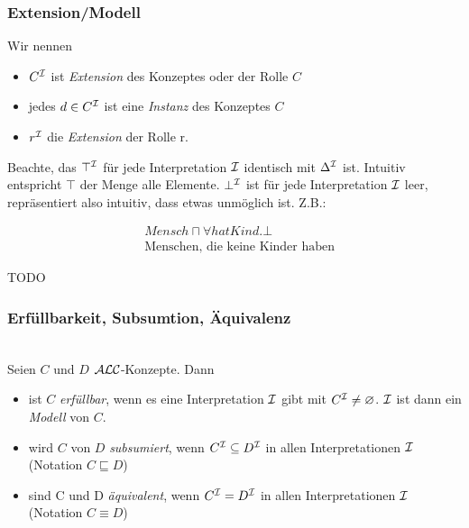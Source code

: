 \subsubsection{Extension/Modell}
\label{sec:exetension}

Wir nennen
\begin{itemize}
\item
  $C^{\mathcal{I}}$ ist \emph{Extension} des Konzeptes oder der Rolle $C$
\item
    jedes $d \in C^{\mathcal{I}}$ ist eine \emph{Instanz} des Konzeptes $C$
\item $r^{\mathcal{I}}$ die \emph{Extension} der Rolle r.
\end{itemize}

Beachte, das $\top^{\mathcal{I}}$ für jede Interpretation $\mathcal{I}$ identisch mit
$\Delta^{\mathcal{I}}$ ist. Intuitiv entspricht $\top$ der Menge alle Elemente.
$\bot^{\mathcal{I}}$ ist für jede Interpretation $\mathcal{I}$ leer, repräsentiert also
intuitiv, dass etwas unmöglich ist. Z.B.:

\begin{align*}
    &\mathit{Mensch} \sqcap \forall \mathit{hatKind}.\bot\\
    &\text{Menschen, die keine Kinder haben}
\end{align*}

\begin{tafel}
    TODO
\end{tafel}

\subsubsection{Erfüllbarkeit, Subsumtion, Äquivalenz}
\label{sec:erfull-subsum-equiv}
\label{erfuxfcllbarkeit-subsumtion-uxe4quivalenz}

\begin{definition}
    \mbox{}\\Seien $C$ und $D$ $\mathcal{A}\mathcal{L}\mathcal{C}$-Konzepte. Dann
\begin{itemize}
\item
  ist $C$ \emph{erfüllbar}, wenn es eine Interpretation $\mathcal{I}$ gibt mit
  $C^{\mathcal{I}} \neq \varnothing$. $\mathcal{I}$ ist dann ein \emph{Modell} von
  $C$.
\item
  wird $C$ von $D$ \emph{subsumiert}, wenn $C^{\mathcal{I}} \subseteq D^{\mathcal{I}}$
  in allen Interpretationen $\mathcal{I}$ (Notation $C \sqsubseteq D$)
\item
  sind C und D \emph{äquivalent}, wenn $C^{\mathcal{I}} = D^{\mathcal{I}}$ in allen
  Interpretationen $\mathcal{I}$ (Notation $C \equiv D$)
\end{itemize}
\end{definition}

